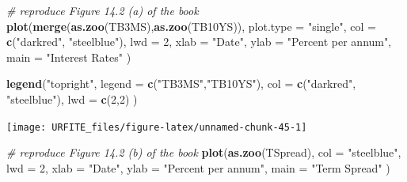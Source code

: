 \documentclass[]{book}
\newenvironment{Shaded}{\begin{snugshade}}{\end{snugshade}}
\newcommand{\KeywordTok}[1]{\textcolor[rgb]{0.13,0.29,0.53}{\textbf{#1}}}
\newcommand{\DataTypeTok}[1]{\textcolor[rgb]{0.13,0.29,0.53}{#1}}
\newcommand{\DecValTok}[1]{\textcolor[rgb]{0.00,0.00,0.81}{#1}}
\newcommand{\StringTok}[1]{\textcolor[rgb]{0.31,0.60,0.02}{#1}}
\newcommand{\CommentTok}[1]{\textcolor[rgb]{0.56,0.35,0.01}{\textit{#1}}}
\newcommand{\OperatorTok}[1]{\textcolor[rgb]{0.81,0.36,0.00}{\textbf{#1}}}
\newcommand{\NormalTok}[1]{#1}
\theoremstyle{definition}
\theoremstyle{definition}
\theoremstyle{definition}
\theoremstyle{remark}
\begin{document}
\begin{Shaded}
\end{Shaded}

\begin{Shaded}
\begin{Highlighting}[]
\CommentTok{# reproduce Figure 14.2 (a) of the book}
\KeywordTok{plot}\NormalTok{(}\KeywordTok{merge}\NormalTok{(}\KeywordTok{as.zoo}\NormalTok{(TB3MS),}\KeywordTok{as.zoo}\NormalTok{(TB10YS)), }
     \DataTypeTok{plot.type =} \StringTok{"single"}\NormalTok{, }
     \DataTypeTok{col =} \KeywordTok{c}\NormalTok{(}\StringTok{"darkred"}\NormalTok{, }\StringTok{"steelblue"}\NormalTok{),}
     \DataTypeTok{lwd =} \DecValTok{2}\NormalTok{,}
     \DataTypeTok{xlab =} \StringTok{"Date"}\NormalTok{,}
     \DataTypeTok{ylab =} \StringTok{"Percent per annum"}\NormalTok{,}
     \DataTypeTok{main =} \StringTok{"Interest Rates"}
\NormalTok{)}

\KeywordTok{legend}\NormalTok{(}\StringTok{"topright"}\NormalTok{, }
       \DataTypeTok{legend =} \KeywordTok{c}\NormalTok{(}\StringTok{"TB3MS"}\NormalTok{,}\StringTok{"TB10YS"}\NormalTok{),}
       \DataTypeTok{col =} \KeywordTok{c}\NormalTok{(}\StringTok{"darkred"}\NormalTok{, }\StringTok{"steelblue"}\NormalTok{),}
       \DataTypeTok{lwd =} \KeywordTok{c}\NormalTok{(}\DecValTok{2}\NormalTok{,}\DecValTok{2}\NormalTok{)}
\NormalTok{       )}
\end{Highlighting}
\end{Shaded}

\begin{center}\texttt{[image: URFITE\_files/figure-latex/unnamed-chunk-45-1]} \end{center}

\begin{Shaded}
\begin{Highlighting}[]
\CommentTok{# reproduce Figure 14.2 (b) of the book}
\KeywordTok{plot}\NormalTok{(}\KeywordTok{as.zoo}\NormalTok{(TSpread), }
     \DataTypeTok{col =} \StringTok{"steelblue"}\NormalTok{,}
     \DataTypeTok{lwd =} \DecValTok{2}\NormalTok{,}
     \DataTypeTok{xlab =} \StringTok{"Date"}\NormalTok{,}
     \DataTypeTok{ylab =} \StringTok{"Percent per annum"}\NormalTok{,}
     \DataTypeTok{main =} \StringTok{"Term Spread"}
\NormalTok{)}
\end{Highlighting}
\end{Shaded}
\end{document}
